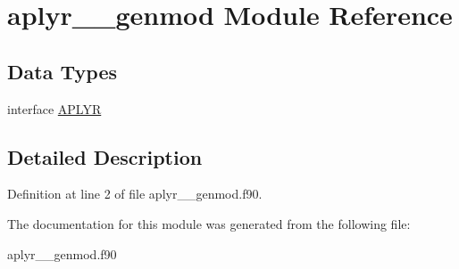 \hypertarget{classaplyr____genmod}{\section{aplyr\+\_\+\+\_\+genmod Module Reference}
\label{classaplyr____genmod}
}
\subsection*{Data Types}
\begin{DoxyCompactItemize}
\item 
interface \hyperlink{interfaceaplyr____genmod_1_1_a_p_l_y_r}{A\+P\+L\+Y\+R}
\end{DoxyCompactItemize}


\subsection{Detailed Description}


Definition at line 2 of file aplyr\+\_\+\+\_\+genmod.\+f90.



The documentation for this module was generated from the following file\+:\begin{DoxyCompactItemize}
\item 
aplyr\+\_\+\+\_\+genmod.\+f90\end{DoxyCompactItemize}
